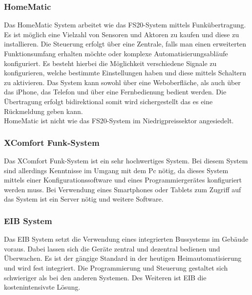 \subsubsection{HomeMatic}
Das HomeMatic System arbeitet wie das FS20-System mittels Funkübertragung. Es ist möglich eine Vielzahl von Sensoren und Aktoren zu kaufen und diese zu installieren. Die Steuerung erfolgt über eine 
Zentrale, falls man einen erweiterten Funktionsumfang erhalten möchte oder komplexe Automatisierungsabläufe konfiguriert. Es besteht hierbei die Möglichkeit verschiedene Signale zu konfigurieren,  welche bestimmte Einstellungen haben und diese mittels Schaltern zu aktivieren. 
Das System kann sowohl über eine Weboberfläche, als auch über das iPhone, das Telefon und über eine Fernbedienung bedient werden. Die Übertragung erfolgt bidirektional somit wird sichergestellt das es eine Rückmeldung geben kann.
\\
HomeMatic ist nicht wie das FS20-System im Niedrigpreissektor angesiedelt.

\subsubsection{XComfort Funk-System}
Das XComfort Funk-System ist ein sehr hochwertiges System. 
Bei diesem System sind allerdings Kenntnisse im Umgang mit dem Pc nötig, da dieses System mittels einer Konfigurationssoftware und eines 
Programmiergerätes konfiguriert werden muss. Bei Verwendung eines Smartphones oder Tablets zum Zugriff auf das System ist ein Server nötig und weitere Software.

\subsubsection{EIB System}
Das EIB System setzt die Verwendung eines integrierten Bussystems im Gebäude voraus. Dabei lassen sich die Geräte zentral und dezentral bedienen und Überwachen. Es ist der gängige Standard in der heutigen Heimautomatisierung und wird fest integriert. Die Programmierung und Steuerung gestaltet sich schwieriger als bei den anderen Systemen. Des Weiteren ist EIB die kostenintensivste Lösung. 

